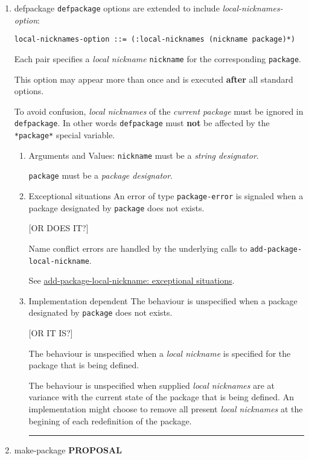 \documentclass[11pt]{article}
\begin{document}
\begin{enumerate}
\item defpackage
\label{sec:orgdd4a60d}
\texttt{defpackage} options are extended to include \emph{local-nicknames-option}:
\begin{verbatim}
local-nicknames-option ::= (:local-nicknames (nickname package)*)
\end{verbatim}


Each pair specifies a \emph{local nickname} \texttt{nickname} for the corresponding
\texttt{package}.

This option may appear more than once and is executed \textbf{after} all standard
options.

To avoid confusion, \emph{local nicknames} of the \emph{current package} must be
ignored in \texttt{defpackage}. In other words \texttt{defpackage} must \textbf{not} be affected
by the \texttt{*package*} special variable.
\begin{enumerate}
\item Arguments and Values:
\label{sec:org7d2bea4}
\texttt{nickname} must be a \emph{string designator}.

\texttt{package} must be a \emph{package designator}.
\item Exceptional situations
\label{sec:org09a4fc2}
An error of type \texttt{package-error} is signaled when a package designated by
\texttt{package} does not exists.

[OR DOES IT?]

Name conflict errors are handled by the underlying calls to
\texttt{add-package-local-nickname}.

See \hyperref[sec:orgd5c07fd]{add-package-local-nickname: exceptional situations}.
\item Implementation dependent
\label{sec:orgf839cd7}
The behaviour is unspecified when a package designated by \texttt{package} does
not exists.

[OR IT IS?]

The behaviour is unspecified when a \emph{local nickname} is specified for the
package that is being defined.

The behaviour is unspecified when supplied \emph{local nicknames} are at
variance with the current state of the package that is being defined. An
implementation might choose to remove all present \emph{local nicknames} at the
begining of each redefinition of the package.

\noindent\rule{\textwidth}{0.5pt}
\end{enumerate}
\item make-package
\label{sec:orgd0f3176}
\textbf{PROPOSAL}


\end{enumerate}
\end{document}
